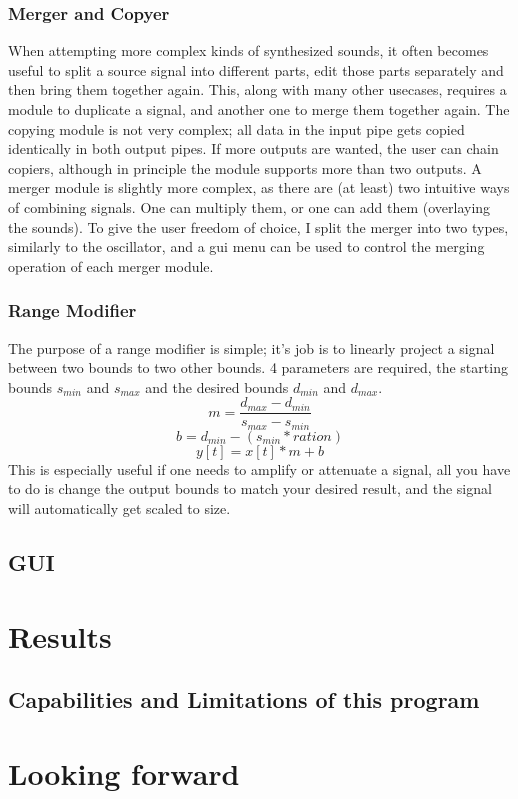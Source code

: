 \documentclass[11pt,a4paper]{article}
\begin{document}
\subsubsection{Merger and Copyer}

When attempting more complex kinds of synthesized sounds, it often becomes useful to split a source signal into different parts, edit those parts separately and then bring them together again. This, along with many other usecases, requires a module to duplicate a signal, and another one to merge them together again. The copying module is not very complex; all data in the input pipe gets copied identically in both output pipes. If more outputs are wanted, the user can chain copiers, although in principle the module supports more than two outputs.
A merger module is slightly more complex, as there are (at least) two intuitive ways of combining signals. One can multiply them, or one can add them (overlaying the sounds). To give the user freedom of choice, I split the merger into two types, similarly to the oscillator, and a gui menu can be used to control the merging operation of each merger module.

\subsubsection{Range Modifier}

The purpose of a range modifier is simple; it's job is to linearly project a signal between two bounds to two other bounds. 4 parameters are required, the starting bounds $s_{min}$ and $s_{max}$ and the desired bounds $d_{min}$ and $d_{max}$.
\begin{equation}
m = \frac{d_{max} - d_{min}}{s_{max} - s_{min}}
\end{equation}
\begin{equation}
b = d_{min} - (s_{min} * ration)
\end{equation}
\begin{equation}
y[t] = x[t]*m + b
\end{equation}
This is especially useful if one needs to amplify or attenuate a signal, all you have to do is change the output bounds to match your desired result, and the signal will automatically get scaled to size.

\subsection{GUI}



\clearpage

\section{Results}

\subsection{Capabilities and Limitations of this program}

\section{Looking forward}


\end{document}
